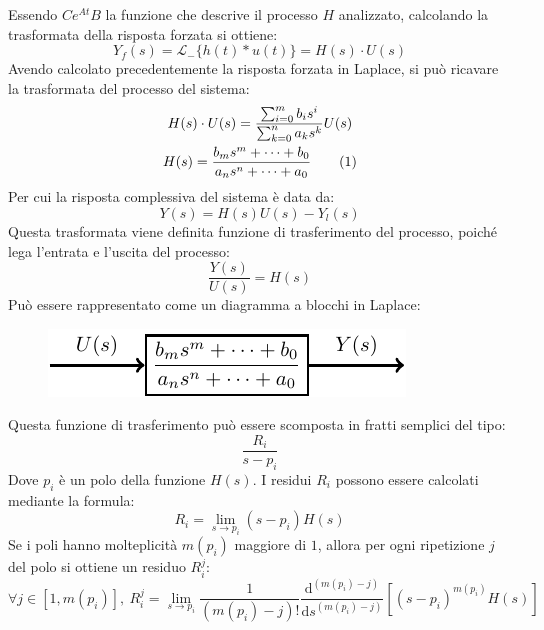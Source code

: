 \documentclass{article}
\numberwithin{equation}{subsection}
\newcommand{\df}{\mathrm{d}}
\newcommand{\tageq}{\tag{\stepcounter{equation}\theequation}}
\begin{document}
Essendo $Ce^{At}B$ la funzione che descrive il processo $H$ analizzato, calcolando la trasformata della risposta forzata si ottiene:
\begin{equation*}
    Y_f(s)=\mathcal{L}_-\{h(t)*u(t)\}=H(s)\cdot U(s)
\end{equation*}
Avendo calcolato precedentemente la risposta forzata in Laplace, si può ricavare la trasformata del processo del sistema:
\begin{gather*}
    H(s)\cdot U(s)=\displaystyle\frac{\sum_{i=0}^{m}b_is^i}{\sum_{k=0}^{n}a_ks^k}U(s)\\
    H(s)=\displaystyle\frac{b_ms^m+\cdots+b_0}{a_ns^n+\cdots+a_0}\tageq
\end{gather*}
Per cui la risposta complessiva del sistema è data da:
\begin{equation*}
    Y(s)=H(s)U(s)-Y_l(s)
\end{equation*}
Questa trasformata viene definita funzione di trasferimento del processo, poiché lega l'entrata e l'uscita del processo: 
\begin{equation}
    \displaystyle\frac{Y(s)}{U(s)}=H(s)
\end{equation}
Può essere rappresentato come un diagramma a blocchi in Laplace:
\begin{figure}[H]%
    \centering
    \includegraphics{blocco-funzionale-5.pdf}%
\end{figure}

Questa funzione di trasferimento può essere scomposta in fratti semplici del tipo:
\begin{equation*}
    \displaystyle\frac{R_i}{s-p_i}
\end{equation*}
Dove $p_i$ è un polo della funzione $H(s)$. I residui $R_i$ possono essere calcolati mediante la formula: 
\begin{equation}
    R_i=\lim_{s\to p_i}(s-p_i)H(s)
\end{equation}
Se i poli hanno molteplicità $m(p_i)$ maggiore di $1$, allora per ogni ripetizione $j$ del polo si ottiene un residuo $R_i^j$:
\begin{equation}
    \forall j\in[1,m(p_i)],\:R_i^j=\lim_{s\to p_i}\displaystyle\frac{1}{(m(p_i)-j)!}\frac{\df^{(m(p_i)-j)}}{\df s^{(m(p_i)-j)}}\left[(s-p_i)^{m(p_i)}H(s)\right]
\end{equation}
\end{document}
